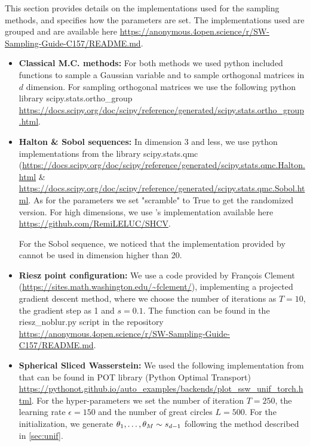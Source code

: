 This section provides details on the implementations used for the sampling methods, and specifies how the parameters are set. The implementations used are grouped and are available here \url{https://anonymous.4open.science/r/SW-Sampling-Guide-C157/README.md}.
\begin{itemize}

\item \textbf{Classical M.C. methods: }For both methods we used python included functions to sample a Gaussian variable and to sample orthogonal matrices in $d$ dimension. For sampling orthogonal matrices we use the following python library scipy.stats.ortho\_group  \url{https://docs.scipy.org/doc/scipy/reference/generated/scipy.stats.ortho_group.html}.

\item \textbf{Halton \& Sobol sequences: }In dimension 3 and less, we use python implementations from the library scipy.stats.qmc (\url{https://docs.scipy.org/doc/scipy/reference/generated/scipy.stats.qmc.Halton.html} \& \url{https://docs.scipy.org/doc/scipy/reference/generated/scipy.stats.qmc.Sobol.html}. As for the parameters we set "scramble" to True to get the randomized version.
For high dimensions, we use \citet{leluc2024slicedwassersteinestimationsphericalharmonics}'s implementation available here \url{https://github.com/RemiLELUC/SHCV}.
\begin{Rk}
{
For the Sobol sequence, we noticed that the implementation provided by \citet{leluc2024slicedwassersteinestimationsphericalharmonics} cannot be used in dimension higher than 20.
}
\end{Rk}

\item \textbf{Riesz point configuration: }{We use a code provided by François Clement (\url{https://sites.math.washington.edu/~fclement/}),} implementing a projected gradient 
descent method, where we choose the number of iterations as $T = 10$, the gradient 
step as
{1}
and $s = 0.1$. {The function can be found in the riesz\_noblur.py script in the repository \url{https://anonymous.4open.science/r/SW-Sampling-Guide-C157/README.md}.}

\item {\textbf{Spherical Sliced Wasserstein: } We used the following implementation from \citet{bonet2023sphericalslicedwasserstein} that can be found in POT library (Python Optimal Transport) \url{https://pythonot.github.io/auto_examples/backends/plot_ssw_unif_torch.html}.
For the hyper-parameters we set the number of iteration $T = 250$, the learning rate $\epsilon = 150$ and the number of great circles $L = 500$. For the initialization, we generate $\theta_1,\hdots,\theta_M\sim s_{d-1}$ following the method described in \autoref{sec:unif}.}


\end{itemize}
